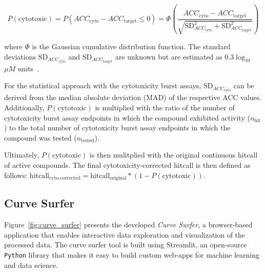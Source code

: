 \[
P(\text{cytotoxic}) = P(ACC_{\text{cyto}} - ACC_{\text{target}} \leq 0) = \Phi\left(\frac{ACC_{\text{cyto}} - ACC_{\text{target}}}{\sqrt{\text{SD}_{ACC_{\text{cyto}}}^2 + \text{SD}_{ACC_{\text{target}}}^2 }}\right)
\]
    
where $\Phi$ is the Gaussian cumulative distribution function. The standard deviations $\text{SD}_{ACC_{\text{cyto}}}$ and $\text{SD}_{ACC_{\text{target}}}$ are unknown but are estimated as $0.3 \log_{10}$ ${\mu M}$ units~\cite{watt2018}. 

For the statistical approach with the cytotoxicity burst assays, $\text{SD}_{ACC_{\text{cyto}}}$ can be derived from the median absolute deviation (MAD) of the respective ACC values. Additionally, $P(\text{cytotoxic})$ is multiplied with the ratio of the number of cytotoxicity burst assay endpoints in which the compound exhibited activity ($n_{\text{hit}}$) to the total number of cytotoxicity burst assay endpoints in which the compound was tested ($n_{\text{tested}}$). 

Ultimately, $P(\text{cytotoxic})$ is then mulitplied with the original continuous hitcall of active compounds. The final cytotoxicity-corrected hitcall is then defined as follows: $\text{hitcall}_{\text{cyto-corrected}} = \text{hitcall}_{\text{original}} * (1 - P(\text{cytotoxic}))$.

\subsection{Curve Surfer}
Figure~\ref{fig:curve_surfer} presents the developed \emph{Curve Surfer}, a browser-based application that enables interactive data exploration and visualization of the processed data. The curve surfer tool is built using Streamlit, an open-source \texttt{Python} library that makes it easy to build custom web-apps for machine learning and data science. 

